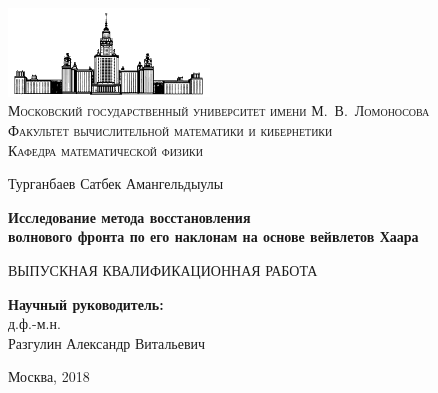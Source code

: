 \documentclass{article}
\begin{document}
\titlepage 


	\thispagestyle{empty}
	
	\begin{center}
		\ \vspace{-1cm}
		
		\includegraphics[width=0.4\textwidth]{msu_logo_small.png}\\
		\textsc { Московский государственный университет имени М.~В.~Ломоносова\\
		Факультет вычислительной математики и кибернетики\\
		Кафедра математической физики}
		
		\vfill
		
		\Large{ Турганбаев Сатбек Амангельдыулы}
		
		\vspace{1cm}
		
	       \LARGE \textbf {Исследование метода восстановления \\волнового фронта по его наклонам на основе вейвлетов Хаара }


		\vspace{1cm}

		\large  {ВЫПУСКНАЯ КВАЛИФИКАЦИОННАЯ РАБОТА }
	\end{center}
	
	\vspace{1cm}
	
	\begin{flushright}
		\large{
		\textbf{Научный руководитель:}\\
		д.ф.-м.н.\\
                Разгулин Александр Витальевич
               }
	\end{flushright}
	
	\vfill
	
	\begin{center}
		\large{Москва, 2018}
	\end{center}





\newpage

\tableofcontents



\end{document}
